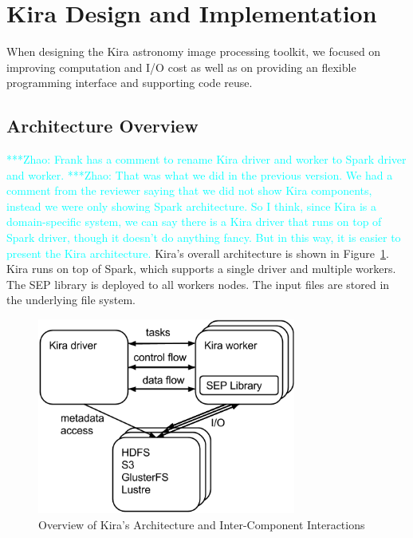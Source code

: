 \documentclass[conference]{IEEEtran}
\newcommand{\zhaonote}[1]{{\textcolor{cyan}    { ***Zhao:      #1 }}}
\newcommand{\zhaonote}[1]{}
\newcommand{\up}{\vspace*{-1em}}
\begin{document}
\section{Kira Design and Implementation}
\label{sec:Design}

When designing the Kira astronomy image processing toolkit, 
we focused on improving computation and  I/O cost as well as on providing an flexible programming interface and supporting code reuse.

\subsection{Architecture Overview}
\label{sec:Design-Overview}
\zhaonote{Frank has a comment to rename Kira driver and worker to Spark driver and worker.}
\zhaonote{That was what we did in the previous version. We had a comment from the reviewer 
saying that we did not show Kira components, instead we were only showing Spark architecture.
So I think, since Kira is a domain-specific system, we can say there is a Kira driver that runs
on top of Spark driver, though it doesn't do anything fancy. But in this way, it is easier to present
the Kira architecture.}
Kira's overall architecture is shown in Figure~\ref{fig:architecture}.
Kira runs on top of Spark, which supports a single driver and multiple workers.
The SEP library is deployed to all workers nodes. The input files are
stored in the underlying file system.

\begin{figure}[t]
	\begin{center}
		\includegraphics[width=85mm]{pictures/Kira-Architecture}
		\caption{Overview of Kira's Architecture and Inter-Component Interactions}
		\label{fig:architecture}
		\up\up
  	\end{center}
\end{figure}
\end{document}
